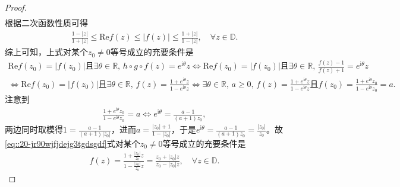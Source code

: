 \documentclass[../../main.tex]{subfiles}%
\begin{document}
\begin{proof}
\begin{align*}
\end{align*}
根据二次函数性质可得
\begin{align}\label{eq::20-jr90wjfjdejg3tgdsgdf}
\frac{1-\left| z \right|}{1+\left| z \right|}\leqslant \mathrm{Re}f(z) \leqslant \left| f(z) \right|\leqslant \frac{1+\left| z \right|}{1-\left| z \right|},\quad \forall z\in\mathbb{D}.
\end{align}
综上可知，上式对某个$z_0\neq 0$等号成立的充要条件是
\begin{align*}
\mathrm{Re}f(z_0)=\left| f(z_0) \right|\text{且}\exists \theta \in \mathbb{R},\,h\circ g\circ f(z)=e^{\mathrm{i}\theta}z\Longleftrightarrow \mathrm{Re}f(z_0)=\left| f(z_0) \right|\text{且}\exists \theta \in \mathbb{R},\,\frac{f(z)-1}{f(z)+1}=e^{\mathrm{i}\theta}z \\
\Longleftrightarrow \mathrm{Re}f(z_0)=\left| f(z_0) \right|\text{且}\exists \theta \in \mathbb{R},\,f(z)=\frac{1+e^{\mathrm{i}\theta}z}{1-e^{\mathrm{i}\theta}z}\Longleftrightarrow \exists \theta \in \mathbb{R},\,a\geqslant 0,\,f(z)=\frac{1+e^{\mathrm{i}\theta}z}{1-e^{\mathrm{i}\theta}z}\text{且}f(z_0)=\frac{1+e^{\mathrm{i}\theta}z_0}{1-e^{\mathrm{i}\theta}z_0}=a.
\end{align*}
注意到
\begin{align*}
\frac{1+e^{\mathrm{i}\theta}z_0}{1-e^{\mathrm{i}\theta}z_0}=a\Longleftrightarrow e^{\mathrm{i}\theta}=\frac{a-1}{(a+1)z_0},
\end{align*}
两边同时取模得$1=\frac{a-1}{(a+1)\left| z_0 \right|}$，进而$a=\frac{\left| z_0 \right|+1}{1-\left| z_0 \right|}$，于是$e^{\mathrm{i}\theta}=\frac{a-1}{(a+1)z_0}=\frac{\left| z_0 \right|}{z_0}$。故\eqref{eq::20-jr90wjfjdejg3tgdsgdf}式对某个$z_0\neq 0$等号成立的充要条件是
\begin{align*}
f(z)=\frac{1+\frac{\left| z_0 \right|}{z_0}z}{1-\frac{\left| z_0 \right|}{z_0}z}=\frac{z_0+\left| z_0 \right|z}{z_0-\left| z_0 \right|z},\quad \forall z\in\mathbb{D}.
\end{align*}
\end{proof}
\end{document}

